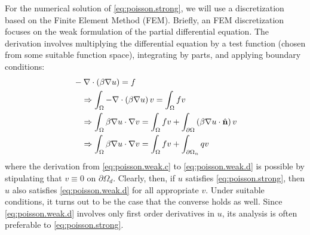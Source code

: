For the numerical solution of \eqref{eq:poisson.strong}, we will use a discretization based on the Finite Element Method (FEM). Briefly, an FEM discretization focuses on the weak formulation of the partial differential equation. The derivation involves multiplying the differential equation by a test function (chosen from some suitable function space), integrating by parts, and applying boundary conditions:
\begin{subequations}
\begin{align}
& -\nabla \cdot \left( \beta \nabla u \right) = f \\
& \quad \Rightarrow \int_{\Omega} -\nabla \cdot \left( \beta \nabla u \right) v = \int_{\Omega} f v \\
& \quad \Rightarrow \int_{\Omega} \beta \nabla u \cdot \nabla v =
    \int_{\Omega} f v + \int_{\partial \Omega} \left( \beta \nabla u \cdot \hat{\mathbf{n}} \right) v \label{eq:poisson.weak.c} \\
& \quad \Rightarrow \int_{\Omega} \beta \nabla u \cdot \nabla v = \int_{\Omega} f v + \int_{\partial \Omega_n} q v \label{eq:poisson.weak.d}
\end{align}
\end{subequations}
where the derivation from \eqref{eq:poisson.weak.c} to \eqref{eq:poisson.weak.d} is possible by stipulating that $v \equiv 0$ on $\partial \Omega_d$. Clearly, then, if $u$ satisfies \eqref{eq:poisson.strong}, then $u$ also satisfies \eqref{eq:poisson.weak.d} for all appropriate $v$. Under suitable conditions, it turns out to be the case that the converse holds as well. Since \eqref{eq:poisson.weak.d} involves only first order derivatives in $u$, its analysis is often preferable to \eqref{eq:poisson.strong}.

